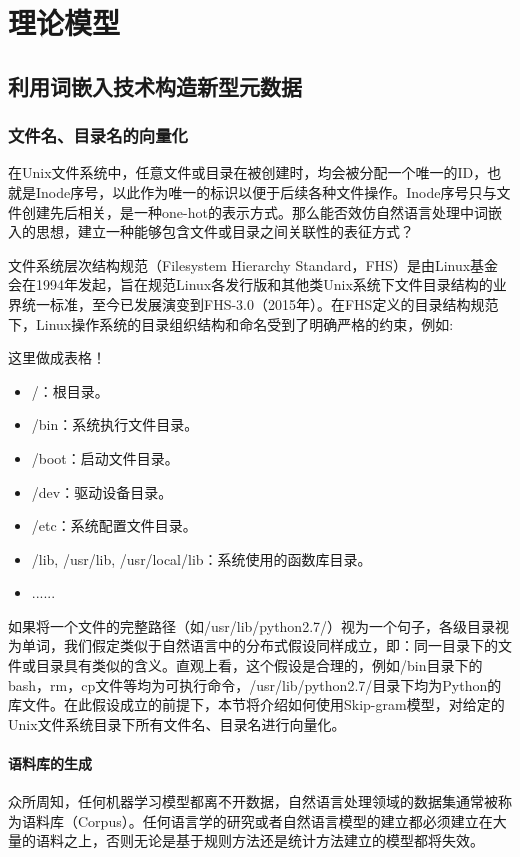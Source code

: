 \chapter{理论模型}
\section{利用词嵌入技术构造新型元数据}
\subsection{文件名、目录名的向量化}
在Unix文件系统中，任意文件或目录在被创建时，均会被分配一个唯一的ID，也就是Inode序号，以此作为唯一的标识以便于后续各种文件操作。Inode序号只与文件创建先后相关，是一种one-hot的表示方式。那么能否效仿自然语言处理中词嵌入的思想，建立一种能够包含文件或目录之间关联性的表征方式？

文件系统层次结构规范（Filesystem Hierarchy Standard，FHS）\cite{fhs}是由Linux基金会在1994年发起，旨在规范Linux各发行版和其他类Unix系统下文件目录结构的业界统一标准，至今已发展演变到FHS-3.0（2015年）。在FHS定义的目录结构规范下，Linux操作系统的目录组织结构和命名受到了明确严格的约束，例如:

{\color{red}这里做成表格！}
\begin{itemize}
    \item /：根目录。
    \item /bin：系统执行文件目录。
    \item /boot：启动文件目录。
    \item /dev：驱动设备目录。
    \item /etc：系统配置文件目录。
    \item /lib, /usr/lib, /usr/local/lib：系统使用的函数库目录。
    \item ......
\end{itemize}

如果将一个文件的完整路径（如/usr/lib/python2.7/）视为一个句子，各级目录视为单词，我们假定类似于自然语言中的分布式假设同样成立，即：同一目录下的文件或目录具有类似的含义。直观上看，这个假设是合理的，例如/bin目录下的bash，rm，cp文件等均为可执行命令，/usr/lib/python2.7/目录下均为Python的库文件。在此假设成立的前提下，本节将介绍如何使用Skip-gram模型，对给定的Unix文件系统目录下所有文件名、目录名进行向量化。

\subsubsection*{语料库的生成}
众所周知，任何机器学习模型都离不开数据，自然语言处理领域的数据集通常被称为语料库（Corpus）。任何语言学的研究或者自然语言模型的建立都必须建立在大量的语料之上，否则无论是基于规则方法还是统计方法建立的模型都将失效。

